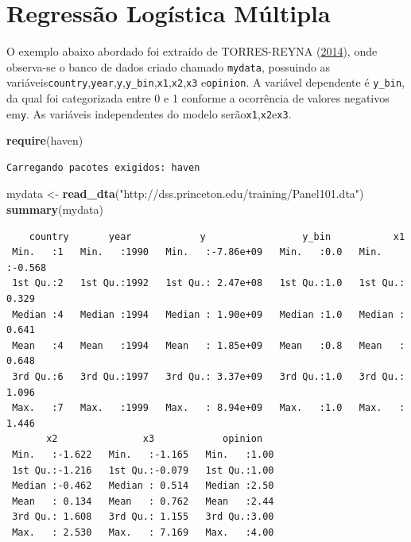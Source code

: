 \documentclass[12pt,brazil,oneside]{book}
\newenvironment{Shaded}{\begin{snugshade}}{\end{snugshade}}
\newcommand{\KeywordTok}[1]{\textcolor[rgb]{0.13,0.29,0.53}{\textbf{#1}}}
\newcommand{\NormalTok}[1]{#1}
\newcommand{\StringTok}[1]{\textcolor[rgb]{0.31,0.60,0.02}{#1}}
\begin{document}
\hypertarget{regressao-logistica-multipla}{%
\section{Regressão Logística
Múltipla}\label{regressao-logistica-multipla}}

O exemplo abaixo abordado foi extraído de TORRES-REYNA
(\protect\hyperlink{ref-Torres-Reyna2014}{2014}), onde observa-se o
banco de dados criado chamado \texttt{mydata}, possuindo as
variáveis\texttt{country},\texttt{year},\texttt{y},\texttt{y\_bin},\texttt{x1},\texttt{x2},\texttt{x3}
e\texttt{opinion}. A variável dependente é \texttt{y\_bin}, da qual foi
categorizada entre 0 e 1 conforme a ocorrência de valores negativos
em\texttt{y}. As variáveis independentes do modelo
serão\texttt{x1},\texttt{x2}e\texttt{x3}.

\begin{Shaded}
\begin{Highlighting}[]
\KeywordTok{require}\NormalTok{(haven)}
\end{Highlighting}
\end{Shaded}

\begin{verbatim}
Carregando pacotes exigidos: haven
\end{verbatim}

\begin{Shaded}
\begin{Highlighting}[]
\NormalTok{mydata <-}\StringTok{ }\KeywordTok{read_dta}\NormalTok{(}\StringTok{"http://dss.princeton.edu/training/Panel101.dta"}\NormalTok{) }
\KeywordTok{summary}\NormalTok{(mydata)}
\end{Highlighting}
\end{Shaded}

\begin{verbatim}
    country       year            y                 y_bin           x1        
 Min.   :1   Min.   :1990   Min.   :-7.86e+09   Min.   :0.0   Min.   :-0.568  
 1st Qu.:2   1st Qu.:1992   1st Qu.: 2.47e+08   1st Qu.:1.0   1st Qu.: 0.329  
 Median :4   Median :1994   Median : 1.90e+09   Median :1.0   Median : 0.641  
 Mean   :4   Mean   :1994   Mean   : 1.85e+09   Mean   :0.8   Mean   : 0.648  
 3rd Qu.:6   3rd Qu.:1997   3rd Qu.: 3.37e+09   3rd Qu.:1.0   3rd Qu.: 1.096  
 Max.   :7   Max.   :1999   Max.   : 8.94e+09   Max.   :1.0   Max.   : 1.446  
       x2               x3            opinion    
 Min.   :-1.622   Min.   :-1.165   Min.   :1.00  
 1st Qu.:-1.216   1st Qu.:-0.079   1st Qu.:1.00  
 Median :-0.462   Median : 0.514   Median :2.50  
 Mean   : 0.134   Mean   : 0.762   Mean   :2.44  
 3rd Qu.: 1.608   3rd Qu.: 1.155   3rd Qu.:3.00  
 Max.   : 2.530   Max.   : 7.169   Max.   :4.00  
\end{verbatim}
\end{document}
